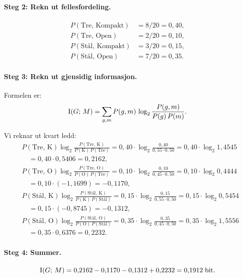 \paragraph{Steg 2: Rekn ut fellesfordeling.}
\begin{align*}
  P(\text{Tre, Kompakt}) &= 8/20 = 0{,}40, \\
  P(\text{Tre, Open}) &= 2/20 = 0{,}10, \\
  P(\text{Stål, Kompakt}) &= 3/20 = 0{,}15, \\
  P(\text{Stål, Open}) &= 7/20 = 0{,}35.
\end{align*}

\paragraph{Steg 3: Rekn ut gjensidig informasjon.}
Formelen er:
\[
  \operatorname{I}(G;\, M) = \sum_{g, m} P(g, m) \,
  \log_2 \frac{P(g, m)}{P(g) \, P(m)}.
\]

Vi reknar ut kvart ledd:
\begin{align*}
  &P(\text{Tre, K}) \log_2
    \frac{P(\text{Tre, K})}{P(\text{K})\,P(\text{Tre})}
  = 0{,}40 \cdot \log_2 \frac{0{,}40}{0{,}55 \cdot 0{,}50}
  = 0{,}40 \cdot \log_2 1{,}4545 \\
  &\quad= 0{,}40 \cdot 0{,}5406 = 0{,}2162, \\[4pt]
  &P(\text{Tre, O}) \log_2
    \frac{P(\text{Tre, O})}{P(\text{O})\,P(\text{Tre})}
  = 0{,}10 \cdot \log_2 \frac{0{,}10}{0{,}45 \cdot 0{,}50}
  = 0{,}10 \cdot \log_2 0{,}4444 \\
  &\quad= 0{,}10 \cdot (-1{,}1699) = -0{,}1170, \\[4pt]
  &P(\text{Stål, K}) \log_2
    \frac{P(\text{Stål, K})}{P(\text{K})\,P(\text{Stål})}
  = 0{,}15 \cdot \log_2 \frac{0{,}15}{0{,}55 \cdot 0{,}50}
  = 0{,}15 \cdot \log_2 0{,}5454 \\
  &\quad= 0{,}15 \cdot (-0{,}8745) = -0{,}1312, \\[4pt]
  &P(\text{Stål, O}) \log_2
    \frac{P(\text{Stål, O})}{P(\text{O})\,P(\text{Stål})}
  = 0{,}35 \cdot \log_2 \frac{0{,}35}{0{,}45 \cdot 0{,}50}
  = 0{,}35 \cdot \log_2 1{,}5556 \\
  &\quad= 0{,}35 \cdot 0{,}6376 = 0{,}2232.
\end{align*}

\paragraph{Steg 4: Summer.}
\[
  \operatorname{I}(G;\, M) = 0{,}2162 - 0{,}1170 - 0{,}1312 + 0{,}2232
  = 0{,}1912 \;\text{bit}.
\]


